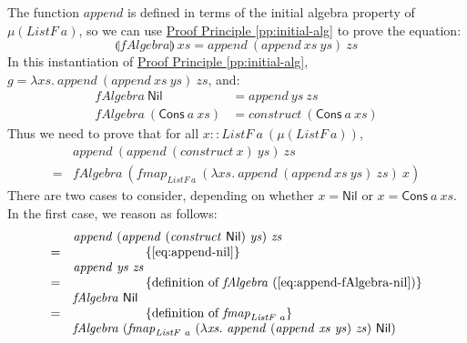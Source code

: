 \documentclass{jfp1}
\newcommand{\fold}[1]{\llparenthesis #1 \rrparenthesis}
\newcommand{\eqAnnotation}[1]{\hspace{2cm}\left\{\textrm{#1}\right\}}
\newcommand{\proofprinref}[1]{\hyperref[#1]{Proof Principle \ref*{#1}}}
\begin{document}
\begin{proof*}
  The function $\mathit{append}$ is defined in terms of the initial
  algebra property of $\mu(\mathit{ListF}~a)$, so we can use
  \proofprinref{pp:initial-alg} to prove the equation:
  \begin{displaymath}
    \fold{\mathit{fAlgebra}}~\mathit{xs} = \mathit{append}~(\mathit{append}~\mathit{xs}~\mathit{ys})~\mathit{zs}
  \end{displaymath}
  In this instantiation of \proofprinref{pp:initial-alg}, $g = \lambda
  \mathit{xs}.~\mathit{append}~(\mathit{append}~\mathit{xs}~\mathit{ys})~\mathit{zs}$,
  and:
  \begin{align}
    \label{eq:append-fAlgebra-nil}
    \mathit{fAlgebra}~\mathsf{Nil} &= \mathit{append}~\mathit{ys}~\mathit{zs} \\
    \label{eq:append-fAlgebra-cons}
    \mathit{fAlgebra}~(\mathsf{Cons}~a~\mathit{xs}) &= \mathit{construct}~(\mathsf{Cons}~a~\mathit{xs})
  \end{align}
  Thus we need to prove that for all $x ::
  \mathit{ListF}~a~(\mu(\mathit{ListF}~a))$,
  \begin{displaymath}
    \begin{array}{cl}
      &\mathit{append}~(\mathit{append}~(\mathit{construct}~x)~\mathit{ys})~\mathit{zs}\\
      =&\mathit{fAlgebra}~(\mathit{fmap}_{\mathit{ListF}~a}~(\lambda \mathit{xs}.~\mathit{append}~(\mathit{append}~\mathit{xs}~\mathit{ys})~\mathit{zs})~x)
    \end{array}
  \end{displaymath}
  There are two cases to consider, depending on whether $x =
  \mathsf{Nil}$ or $x = \mathsf{Cons}~a~\mathit{xs}$. In the first
  case, we reason as follows:
  \begin{displaymath}
    \begin{array}{cl}
      & \mathit{append}~(\mathit{append}~(\mathit{construct}~\mathsf{Nil})~\mathit{ys})~\mathit{zs}\\
      =&\eqAnnotation{\autoref{eq:append-nil}} \\
      & \mathit{append}~\mathit{ys}~\mathit{zs} \\
      =&\eqAnnotation{definition of $\mathit{fAlgebra}$ (\autoref{eq:append-fAlgebra-nil})} \\
      & \mathit{fAlgebra}~\mathsf{Nil} \\
      =&\eqAnnotation{definition of $\mathit{fmap}_{\mathit{ListF}~a}$} \\
      & \mathit{fAlgebra}~(\mathit{fmap}_{\mathit{ListF}~a}~(\lambda \mathit{xs}.~\mathit{append}~(\mathit{append}~\mathit{xs}~\mathit{ys})~\mathit{zs})~\mathsf{Nil})

\end{array}
\end{displaymath}
\end{proof*}
\end{document}
